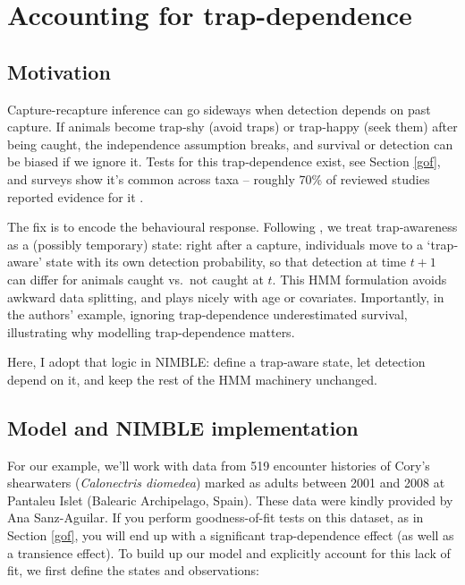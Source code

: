\documentclass[
  12pt,
]{krantz}
\begin{document}
\section{Accounting for trap-dependence}\label{trapdep}

\subsection{Motivation}\label{motivation-3}

Capture-recapture inference can go sideways when detection depends on past capture. If animals become trap‐shy (avoid traps) or trap‐happy (seek them) after being caught, the independence assumption breaks, and survival or detection can be biased if we ignore it. Tests for this trap‐dependence exist, see Section \ref{gof}, and surveys show it's common across taxa -- roughly 70\% of reviewed studies reported evidence for it \citep{pradeltrapdep2012}.

The fix is to encode the behavioural response. Following \citet{pradeltrapdep2012}, we treat trap‐awareness as a (possibly temporary) state: right after a capture, individuals move to a `trap‐aware' state with its own detection probability, so that detection at time \(t+1\) can differ for animals caught vs.~not caught at \(t\). This HMM formulation avoids awkward data splitting, and plays nicely with age or covariates. Importantly, in the authors' example, ignoring trap‐dependence underestimated survival, illustrating why modelling trap-dependence matters.

Here, I adopt that logic in NIMBLE: define a trap‐aware state, let detection depend on it, and keep the rest of the HMM machinery unchanged.

\subsection{Model and NIMBLE implementation}\label{model-and-nimble-implementation-3}

For our example, we'll work with data from 519 encounter histories of Cory's shearwaters (\emph{Calonectris diomedea}) marked as adults between 2001 and 2008 at Pantaleu Islet (Balearic Archipelago, Spain). These data were kindly provided by Ana Sanz-Aguilar. If you perform goodness-of-fit tests on this dataset, as in Section \ref{gof}, you will end up with a significant trap-dependence effect (as well as a transience effect). To build up our model and explicitly account for this lack of fit, we first define the states and observations:
\end{document}
